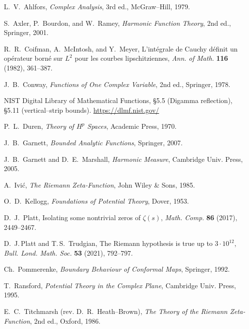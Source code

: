 \documentclass[11pt]{article}
\numberwithin{equation}{section}
\theoremstyle{remark}
\begin{document}

\begin{thebibliography}{99}

L.~V.~Ahlfors, \emph{Complex Analysis}, 3rd ed., McGraw--Hill, 1979.

S.~Axler, P.~Bourdon, and W.~Ramey, \emph{Harmonic Function Theory}, 2nd ed., Springer, 2001.

R.~R.~Coifman, A.~McIntosh, and Y.~Meyer,
L’int\'egrale de Cauchy d\'efinit un op\'erateur born\'e sur $L^2$ pour les courbes lipschitziennes,
\emph{Ann. of Math.} \textbf{116} (1982), 361--387.

J.~B.~Conway, \emph{Functions of One Complex Variable}, 2nd ed., Springer, 1978.

NIST Digital Library of Mathematical Functions, \S5.5 (Digamma reflection), \S5.11 (vertical--strip bounds).
\url{https://dlmf.nist.gov/}

P.~L.~Duren, \emph{Theory of $H^p$ Spaces}, Academic Press, 1970.

J.~B.~Garnett, \emph{Bounded Analytic Functions}, Springer, 2007.

J.~B.~Garnett and D.~E.~Marshall, \emph{Harmonic Measure}, Cambridge Univ. Press, 2005.

A.~Ivi\'c, \emph{The Riemann Zeta-Function}, John Wiley \& Sons, 1985.

O.~D.~Kellogg, \emph{Foundations of Potential Theory}, Dover, 1953.

D.~J.~Platt, Isolating some nontrivial zeros of $\zeta(s)$, \emph{Math. Comp.} \textbf{86} (2017), 2449–2467.

D.~J.\,Platt and T.\,S.~Trudgian, The Riemann hypothesis is true up to $3\cdot 10^{12}$,
\emph{Bull. Lond. Math. Soc.} \textbf{53} (2021), 792–797.

Ch.~Pommerenke, \emph{Boundary Behaviour of Conformal Maps}, Springer, 1992.

T.~Ransford, \emph{Potential Theory in the Complex Plane}, Cambridge Univ. Press, 1995.

E.~C.~Titchmarsh (rev. D.~R.~Heath--Brown), \emph{The Theory of the Riemann Zeta-Function}, 2nd ed., Oxford, 1986.

\end{thebibliography}
\end{document}
